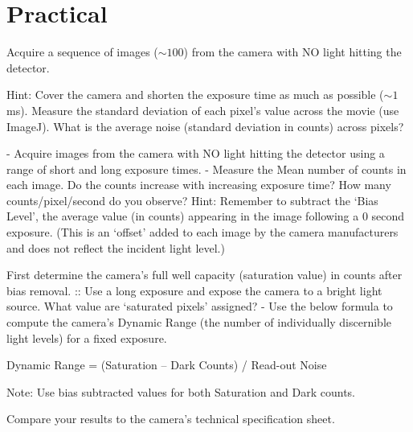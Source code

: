 \documentclass[a4paper]{report}
\newcommand{\nexercise}[0]{\arabic{exercises}\addtocounter{exercises}{1}}
\begin{document}
\section{Practical}
\begin{exercisebox}[frametitle={Exercise \nexercise: Measure readout noise}]
Acquire a sequence of images ($\sim100$) from the camera with NO light hitting the detector. 

Hint: Cover the camera and shorten the exposure time as much as possible ($\sim1$ ms). Measure the standard deviation of each pixel’s value across the movie (use ImageJ). 
What is the average noise (standard deviation in counts) across pixels? 
\end{exercisebox}

\begin{exercisebox}[frametitle={Exercise \nexercise: Measure dark counts}]
- Acquire images from the camera with NO light hitting the detector using a range of short and long exposure times.
- Measure the Mean number of counts in each image. Do the counts increase with increasing exposure time? How many counts/pixel/second do you observe? 
Hint: Remember to subtract the ‘Bias Level’, the average value (in counts) appearing in the image following a 0 second exposure. (This is an ‘offset’ added to each image by the camera manufacturers and does not reflect the incident light level.) 
\end{exercisebox}

\begin{exercisebox}[frametitle={Exercise \nexercise: Compute the dynamic range of the camera}]
First determine the camera’s full well capacity (saturation value) in counts after bias removal. 
:: Use a long exposure and expose the camera to a bright light source. What value are ‘saturated pixels’ assigned? 
- Use the below formula to compute the camera’s Dynamic Range (the number of individually discernible light levels) for a fixed exposure. 

Dynamic Range = (Saturation – Dark Counts) / Read-out Noise

Note: Use bias subtracted values for both Saturation and Dark counts.

Compare your results to the camera’s technical specification sheet. 
\end{exercisebox}
\end{document}
